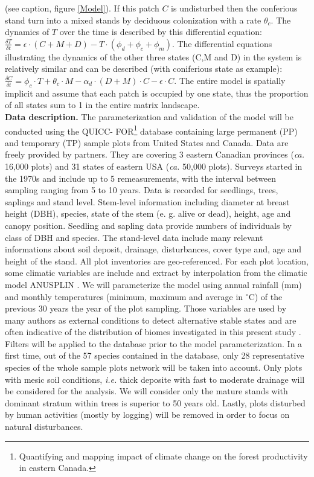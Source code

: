(see caption, figure \ref{Model}). If this patch $C$ is undisturbed then the
conferious stand turn into a mixed stands by deciduous colonization with a
rate $\theta_c$. The dynamics of $T$ over the time is described by this
differential equation: $\frac{\delta T}{\delta t} = \epsilon \cdot (C+M+D) - T
\cdot (\phi_d + \phi_c + \phi_m)$. The differential equations illustrating the
dynamics of the other three states (C,M and D) in the system is relatively
similar and can be described (with coniferious state as example):
$\frac{\delta C}{\delta t} = \phi_c \cdot T + \theta_c \cdot M - \alpha_d
\cdot (D+M)\cdot C - \epsilon \cdot C$. The entire model is spatially implicit
and assume that each patch is occupied by one state, thus the proportion of
all states sum to 1 in the entire matrix landscape. \\

\textbf{Data description.} The parameterization and validation of the model
will be conducted using the QUICC- FOR\footnote{Quantifying and mapping impact
of climate change on the forest productivity in eastern Canada.} database
containing large permanent (PP) and temporary (TP) sample plots from United
States and Canada. Data are freely provided by partners. They are covering 3
eastern Canadian provinces (\textit{ca.} 16,000 plots) and 31 states of
eastern USA (\textit{ca.} 50,000 plots). Surveys started in the 1970s and
include up to 5 remeasurements, with the interval between sampling ranging
from 5 to 10 years. Data is recorded for seedlings, trees, saplings and stand
level. Stem-level information including diameter at breast height (DBH),
species, state of the stem (e. g. alive or dead), height, age and canopy
position. Seedling and sapling data provide numbers of individuals by class of
DBH and species. The stand-level data include many relevant informations about
soil deposit, drainage, disturbances, cover type and, age and height of the
stand. All plot inventories are geo-referenced. For each plot location, some
climatic variables are include and extract by interpolation from the climatic
model ANUSPLIN \cite{McKenney2011}. We will parameterize the model using
annual rainfall (mm) and monthly temperatures (minimum, maximum and average in
\ensuremath{^\circ}C) of the previous 30 years the year of the plot sampling.
Those variables are used by many authors as external conditions to detect
alternative stable states and are often indicative of the distribution of
biomes investigated in this present study
\cite{Goldblum2010,Hirota2011,Scheffer2012}. Filters will be applied to the
database prior to the model parameterization. In a first time, out of the 57
species contained in the  database, only 28 representative species of the
whole sample plots network will be taken into account. Only plots with mesic
soil conditions, \textit{i.e.} thick deposite with fast to moderate drainage
will be considered for the analysis. We will consider only the mature stands
with dominant stratum within trees is superior to 50 years old. Lastly, plots
disturbed by human activities (mostly by logging) will be removed in order to
focus on natural disturbances. \\

